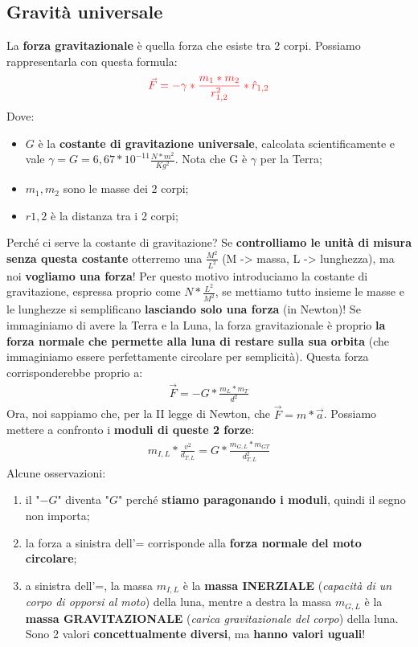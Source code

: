     \subsection{Gravità universale}
        La \textbf{forza gravitazionale} è quella forza che esiste tra 2 corpi. Possiamo rappresentarla con questa formula:
        \begin{align*}
            \textcolor{Red}{\vec{F} = -\gamma*\frac{m_1*m_2}{r^2_{1,2}}*\hat{r}_{1,2}}
        \end{align*}
        Dove:
        \begin{itemize}
            \item $G$ è la \textbf{costante di gravitazione universale}, calcolata scientificamente e vale $\gamma = G =6,67*10^{-11}\frac{N*m^2}{Kg^2}$. Nota che G è $\gamma$ per la Terra;
            \item $m_1, m_2$ sono le masse dei 2 corpi;
            \item $r{1,2}$ è la distanza tra i 2 corpi;
        \end{itemize}
        Perché ci serve la costante di gravitazione? Se \textbf{controlliamo le unità di misura senza questa costante} otterremo una $\frac{M^2}{L^2}$ (M -> massa, L -> lunghezza), ma noi \textbf{vogliamo una forza}! Per questo motivo introduciamo la costante di gravitazione, espressa proprio come $N*\frac{L^2}{M^2}$, se mettiamo tutto insieme le masse e le lunghezze si semplificano \textbf{lasciando solo una forza} (in Newton)! Se immaginiamo di avere la Terra e la Luna, la forza gravitazionale è proprio \textbf{la forza normale che permette alla luna di restare sulla sua orbita} (che immaginiamo essere perfettamente circolare per semplicità). Questa forza corrisponderebbe proprio a:
        \begin{align*}
            \vec{F} = -G*\frac{m_L*m_T}{d^2}
        \end{align*}
        Ora, noi sappiamo che, per la II legge di Newton, che $\vec{F}=m*\vec{a}$. Possiamo mettere a confronto i \textbf{moduli di queste 2 forze}:
        \begin{align*}
            m_{I,L}*\frac{v^2}{d_{T,L}} = G*\frac{m_{G,L}*m_{GT}}{d^2_{T,L}}
        \end{align*}
        Alcune osservazioni:
        \begin{enumerate}
            \item il "$-G$" diventa "$G$" perché \textbf{stiamo paragonando i moduli}, quindi il segno non  importa;
            \item la forza a sinistra dell'= corrisponde alla \textbf{forza normale del moto circolare};
            \item a sinistra dell'=, la massa $m_{I, L}$ è la \textbf{massa INERZIALE} (\textit{capacità di un corpo di opporsi al moto}) della luna, mentre a destra la massa $m_{G, L}$ è la \textbf{massa GRAVITAZIONALE} (\textit{carica gravitazionale del corpo}) della luna. Sono 2 valori \textbf{concettualmente diversi}, ma \textbf{hanno valori uguali}!
        \end{enumerate}
